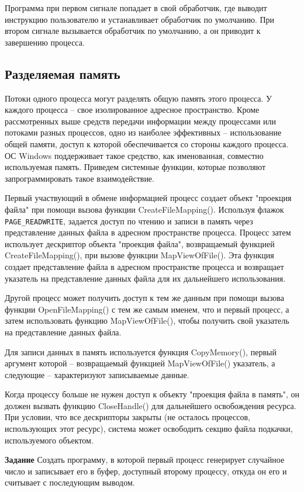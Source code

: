 \documentclass[a4paper]{article}
\begin{document}
	Программа при первом сигнале попадает в свой обработчик, где выводит инструкцию пользователю и устанавливает обработчик по умолчанию. При втором сигнале вызывается обработчик по умолчанию, а он приводит к завершению процесса.
	
\subsection{Разделяемая память}
	Потоки одного процесса могут разделять общую память этого процесса. У каждого процесса – свое изолированное адресное пространство. Кроме рассмотренных выше средств передачи информации между процессами или потоками разных процессов, одно из наиболее эффективных – использование общей памяти, доступ к которой обеспечивается со стороны каждого процесса. ОС Windows поддерживает такое средство, как именованная, совместно используемая память.
Приведем системные функции, которые позволяют запрограммировать такое взаимодействие.
	
	Первый участвующий в обмене информацией процесс создает объект "проекция файла" при помощи вызова функции CreateFileMapping(). Используя флажок \texttt{PAGE\_READWRITE}, задается доступ по чтению и записи в память через представление данных файла в адресном пространстве процесса. Процесс затем использует дескриптор объекта "проекция файла", возвращаемый функцией CreateFileMapping(), при вызове функции MapViewOfFile(). Эта функция создает представление файла в адресном пространстве процесса и возвращает указатель на представление данных файла для их дальнейшего использования.
	
	Другой процесс может получить доступ к тем же данным при помощи вызова функции OpenFileMapping() с тем же самым именем, что и первый процесс, а затем использовать функцию MapViewOfFile(), чтобы получить свой указатель на представление данных файла.
	
	Для записи данных в память используется функция CopyMemory(), первый аргумент которой – возвращаемый функцией MapViewOfFile() указатель, а следующие – характеризуют записываемые данные.
	
	Когда процессу больше не нужен доступ к объекту "проекция файла в память", он должен вызвать функцию CloseHandle() для дальнейшего освобождения ресурса. При условии, что все дескрипторы закрыты (не осталось процессов, использующих этот ресурс), система может освободить секцию файла подкачки, используемого объектом.
	
	\textbf{Задание} Создать программу, в которой первый процесс генерирует случайное число и записывает его в буфер, доступный второму процессу, откуда он его и считывает с последующим выводом.
	
\end{document}
